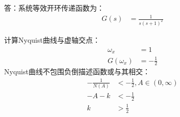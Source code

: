 \onlyanswer
{
答：系统等效开环传递函数为：
\begin{align*}
G(s) &=\frac{1}{s(s+1)^2}
\end{align*}

计算Nyquist曲线与虚轴交点：
\begin{align*}
\omega_x &=1 \\
G(\omega_x) &= -\frac{1}{2}
\end{align*}
Nyquist曲线不包围负倒描述函数或与其相交：
\begin{align*}
-\frac{1}{N(A)} &< -\frac{1}{2} ,A\in(0,\infty)\\
-A-k&<-\frac{1}{2}\\
k &>\frac{1}{2}
\end{align*}
}